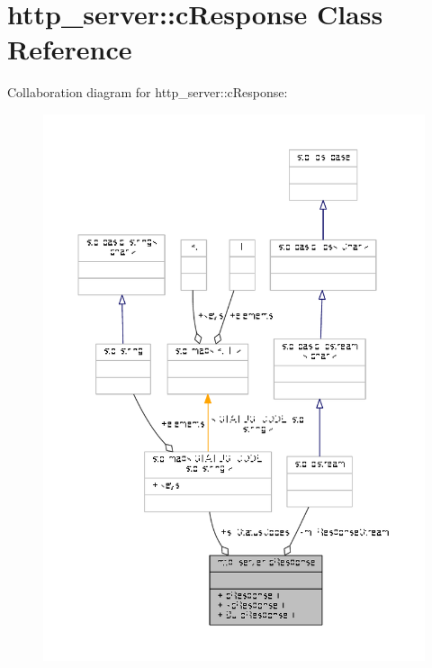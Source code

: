 \hypertarget{classhttp__server_1_1cResponse}{\section{http\-\_\-server\-:\-:c\-Response Class Reference}
\label{classhttp__server_1_1cResponse}
}


Collaboration diagram for http\-\_\-server\-:\-:c\-Response\-:
\nopagebreak
\begin{figure}[H]
\begin{center}
\leavevmode
\includegraphics[width=350pt]{classhttp__server_1_1cResponse__coll__graph}
\end{center}
\end{figure}
